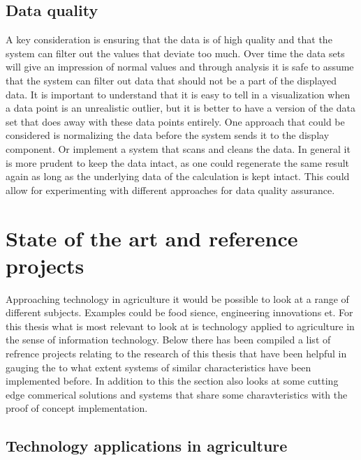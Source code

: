 \documentclass[]{uiophd}
\begin{document}
\section{Data quality}
A key consideration is ensuring that the data is of high quality and that the system can filter out the values that deviate too much. Over time the data sets will give an impression of normal values and through analysis it is safe to assume that the system can filter out data that should not be a part of the displayed data. It is important to understand that it is easy to tell in a visualization when a data point is an unrealistic outlier, but it is better to have a version of the data set that does away with these data points entirely. One approach that could be considered is normalizing the data before the system sends it to the display component. Or implement a system that scans and cleans the data. In general it is more prudent to keep the data intact, as one could regenerate the same result again as long as the underlying data of the calculation is kept intact. This could allow for experimenting with different approaches for data quality assurance.

\chapter{State of the art and reference projects}


Approaching technology in agriculture it would be possible to look at a range of different subjects. Examples could be food sience, engineering innovations et. For this thesis what is most relevant to look at is technology applied to agriculture in the sense of information technology. Below there has been compiled a list of refrence projects relating to the research of this thesis that have been helpful in gauging the to what extent systems of similar characteristics have been implemented before. In addition to this the section also looks at some cutting edge commerical solutions and systems that share some charavteristics with the proof of concept implementation.

\section{Technology applications in agriculture}
\end{document}
